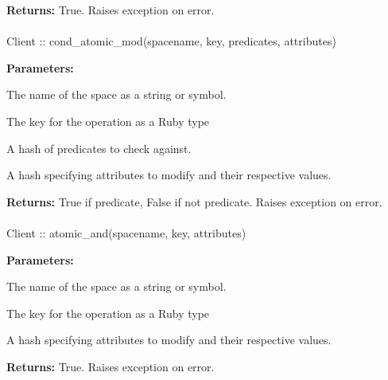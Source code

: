 \noindent\textbf{Returns:}
True.  Raises exception on error.

\paragraph{}
\label{api:ruby:cond_atomic_mod}
\begin{rubycode}
Client :: cond_atomic_mod(spacename, key, predicates, attributes)
\end{rubycode}


\noindent\textbf{Parameters:}
\begin{description}[labelindent=\widthof{{\code{predicates}}},leftmargin=*,noitemsep,nolistsep,align=right]
\item[\code{spacename}] The name of the space as a string or symbol.
\item[\code{key}] The key for the operation as a Ruby type
\item[\code{predicates}] A hash of predicates to check against.
\item[\code{attributes}] A hash specifying attributes to modify and their respective values.
\end{description}

\noindent\textbf{Returns:}
True if predicate, False if not predicate.  Raises exception on error.

\paragraph{}
\label{api:ruby:atomic_and}
\begin{rubycode}
Client :: atomic_and(spacename, key, attributes)
\end{rubycode}


\noindent\textbf{Parameters:}
\begin{description}[labelindent=\widthof{{\code{attributes}}},leftmargin=*,noitemsep,nolistsep,align=right]
\item[\code{spacename}] The name of the space as a string or symbol.
\item[\code{key}] The key for the operation as a Ruby type
\item[\code{attributes}] A hash specifying attributes to modify and their respective values.
\end{description}

\noindent\textbf{Returns:}
True.  Raises exception on error.

